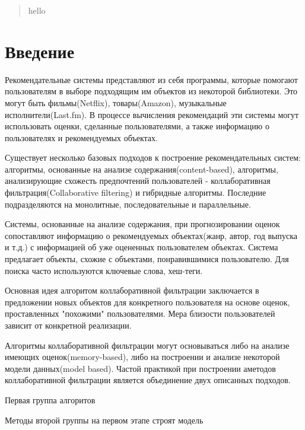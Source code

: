 \documentclass[12pt]{article} %
\begin{document}
\begin{abstract}
hello
\end{abstract}

\section{Введение}
\par Рекомендательные системы представляют из себя программы, которые помогают пользователям в выборе подходящим им объектов из некоторой библиотеки.  %
Это могут быть фильмы(Netflix), товары(Amazon), музыкальные исполнители(Last.fm). В процессе вычисления рекомендаций эти системы могут использовать оценки, сделанные пользователями, а также информацию о пользователях и рекомендуемых объектах.


\par
Существует несколько базовых подходов к построение рекомендательных систем: алгоритмы, основанные на анализе содержания(content-based), алгоритмы, анализирующие схожесть предпочтений пользователей - коллаборативная фильтрация(Collaborative filtering) и гибридные алгоритмы. Последние подразделяются на монолитные, последовательные и параллельные.
\par
Системы, основанные на анализе содержания, при прогнозировании оценок сопоставляют информацию о рекомендуемых объектах(жанр, автор, год выпуска и т.д.) с информацией об уже оцененных пользователем объектах. Система предлагает объекты, схожие с объектами, понравившимися пользователю. Для поиска часто используются ключевые слова, хеш-теги. 
\par
Основная идея алгоритом коллаборативной фильтрации заключается в предложении новых объектов для конкретного пользователя на основе оценок, проставленных "похожими" пользователями. Мера близости пользователей зависит от конкретной реализации.
\par
Алгоритмы коллаборативной фильтрации могут основываться либо на анализе имеющих оценок(memory-based), либо на построении и анализе некоторой модели данных(model based). Частой практикой при построении аметодов коллаборативной фильтрации является объединение двух описанных подходов.
\par
Первая группа алгоритов
\par
Методы второй группы на первом этапе строят модель 

\end{document}

